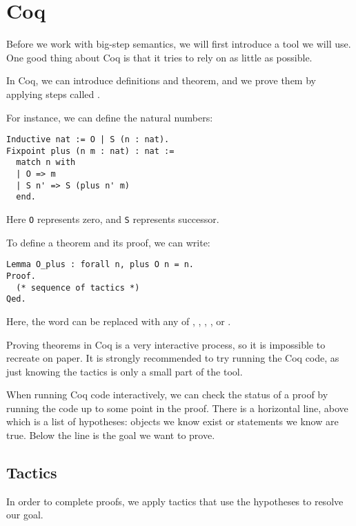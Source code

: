 \documentclass[class=scrartcl]{standalone}
\begin{document}
\section{Coq}
Before we work with big-step semantics,
we will first introduce a tool we will use.
One good thing about Coq is that it tries to rely on as little as possible.

In Coq, we can introduce definitions and theorem,
and we prove them by applying steps called .

For instance, we can define the natural numbers:
\begin{verbatim}
Inductive nat := O | S (n : nat).
Fixpoint plus (n m : nat) : nat :=
  match n with
  | O => m
  | S n' => S (plus n' m)
  end.
\end{verbatim}

Here \texttt{O} represents zero, and
\texttt{S} represents successor.

To define a theorem and its proof, we can write:
\begin{verbatim}
Lemma O_plus : forall n, plus O n = n.
Proof.
  (* sequence of tactics *)
Qed.
\end{verbatim}

Here, the word  can be replaced with any of
,
,
,
, or
.

Proving theorems in Coq is a very interactive process,
so it is impossible to recreate on paper.
It is strongly recommended to try running the Coq code,
as just knowing the tactics is only a small part of the tool.

When running Coq code interactively,
we can check the status of a proof
by running the code up to some point in the proof.
There is a horizontal line,
above which is a list of hypotheses:
objects we know exist or statements we know are true.
Below the line is the goal we want to prove.


\subsection{Tactics}
In order to complete proofs,
we apply tactics that use the hypotheses to resolve our goal.
\end{document}
